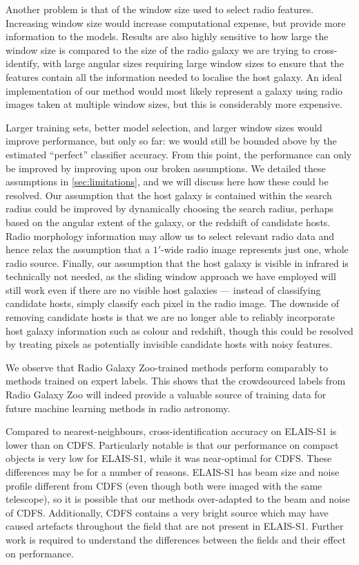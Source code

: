 \documentclass[fleqn,usenatbib,usedcolumn]{mnras}
\begin{document}
  Another problem is that of the window size used to select radio features.
  Increasing window size would increase computational expense, but provide
  more information to the models. Results are also highly sensitive to how
  large the window size is compared to the size of the radio galaxy we are
  trying to cross-identify, with large angular sizes requiring large window
  sizes to ensure that the features contain all the information needed to
  localise the host galaxy. An ideal implementation of our method would most
  likely represent a galaxy using radio images taken at multiple window
  sizes, but this is considerably more expensive.

  Larger training sets, better model selection, and larger window sizes
  would improve performance, but only so far: we would still be bounded
  above by the estimated ``perfect'' classifier accuracy. From this point,
  the performance can only be improved by improving upon our broken
  assumptions. We detailed these assumptions in \autoref{sec:limitations},
  and we will discuss here how these could be resolved. Our assumption that the host galaxy is contained within the search radius could be improved by
  dynamically choosing the search radius, perhaps based on the angular
  extent of the galaxy, or the redshift of candidate hosts. Radio morphology information may allow us to select relevant radio data and hence relax the assumption that a $1'$-wide radio image represents just one, whole radio source. Finally, our
  assumption that the host galaxy is visible in infrared is technically not
  needed, as the sliding window approach we have employed will still work
  even if there are no visible host galaxies --- instead of classifying
  candidate hosts, simply classify each pixel in the radio image. The
  downside of removing candidate hosts is that we are no longer able to
  reliably incorporate host galaxy information such as colour and redshift,
  though this could be resolved by treating pixels as potentially invisible
  candidate hosts with noisy features.

  We observe that Radio Galaxy Zoo-trained methods perform comparably to
  methods trained on expert labels. This shows that the crowdsourced labels
  from Radio Galaxy Zoo will indeed provide a valuable source of training
  data for future machine learning methods in radio astronomy.

  Compared to nearest-neighbours, cross-identification accuracy on ELAIS-S1 is lower than on CDFS. Particularly notable is that our performance on compact objects is very low for ELAIS-S1, while it was near-optimal for CDFS. These differences may be for a number of reasons. ELAIS-S1 has beam size and noise profile different from CDFS (even though both were imaged with the same telescope), so it is possible that our methods over-adapted to the beam and noise of CDFS. Additionally, CDFS contains a very bright source which may have caused artefacts throughout the field that are not present in ELAIS-S1. Further work is required to understand the differences between the fields and their effect on performance.
\end{document}
